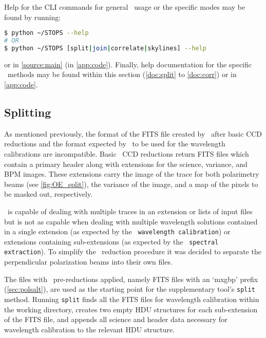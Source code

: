 Help for the \gls{CLI} commands for general \stops\ usage or the specific modes may be found by running:
\begin{lstlisting}[language=bash]
$ python ~/STOPS --help
# OR
$ python ~/STOPS [split|join|correlate|skylines] --help
\end{lstlisting}
{\parskip=0pt or} in \autoref{source:main} (in \autoref{app:code}). Finally, help documentation for the specific \stops\ methods may be found within this section (\autoref{doc:split} to \ref{doc:corr}) or in \autoref{app:code}.

\subsection{Splitting} \label{subsec:stops_split}



As mentioned previously, the format of the \gls{FITS} file created by \polsalt\ after basic \gls{CCD} reductions and the format expected by \iraf\ to be used for the wavelength calibrations are incompatible. Basic \polsalt\ \gls{CCD} reductions return \gls{FITS} files which contain a primary header along with extensions for the science, variance, and \gls{BPM} images. These extensions carry the image of the trace for both polarimetry beams (see \autoref{fig:OE_split}), the variance of the image, and a map of the pixels to be masked out, respectively.

\iraf\ is capable of dealing with multiple traces in an extension or lists of input files but is not as capable when dealing with multiple wavelength solutions contained in a single extension (as expected by the \polsalt\ \texttt{wavelength calibration}) or extensions containing sub-extensions (as expected by the \polsalt\ \texttt{spectral extraction}). To simplify the \iraf\ reduction procedure it was decided to separate the perpendicular polarization beams into their own files.

The files with \polsalt\ pre-reductions applied, namely \gls{FITS} files with an `mxgbp' prefix (\autoref{sec:polsalt}), are used as the starting point for the supplementary tool's \texttt{split} method. Running \texttt{split} finds all the \gls{FITS} files for wavelength calibration within the working directory, creates two empty \gls{HDU} structures for each sub-extension of the \gls{FITS} file, and appends all science and header data necessary for wavelength calibration to the relevant \gls{HDU} structure.

